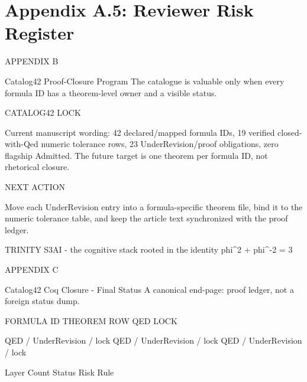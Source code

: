 
\section{Appendix A.5: Reviewer Risk Register}

APPENDIX B

           Catalog42 Proof-Closure Program
     The catalogue is valuable only when every formula ID has a theorem-level owner and
                                       a visible status.

  CATALOG42 LOCK

  Current manuscript wording: 42 declared/mapped formula IDs, 19 verified closed-with-Qed numeric tolerance
  rows, 23 UnderRevision/proof obligations, zero flagship Admitted. The future target is one theorem per
  formula ID, not rhetorical closure.

  NEXT ACTION

  Move each UnderRevision entry into a formula-specific theorem file, bind it to the numeric tolerance
  table, and keep the article text synchronized with the proof ledger.

                           TRINITY S3AI - the cognitive stack rooted in the identity phi\textasciicircum{}2 + phi\textasciicircum{}-2 = 3

                                                               APPENDIX C

             Catalog42 Coq Closure - Final Status
                           A canonical end-page: proof ledger, not a foreign status dump.

                      FORMULA ID                             THEOREM ROW                                    QED LOCK

                  QED / UnderRevision / lock               QED / UnderRevision / lock                QED / UnderRevision / lock

             Layer                             Count                      Status                           Risk                      Rule